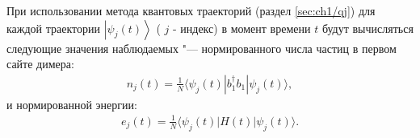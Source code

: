 При использовании метода квантовых траекторий (раздел \cref{sec:ch1/qj}) для каждой траектории \(\left| \psi_j(t) \right\rangle\) ( \(j\) - индекс) в момент времени \(t\) будут вычисляться следующие значения наблюдаемых "--- нормированного числа частиц в первом сайте димера:
\begin{equation}
	\label{eq:dimer_num_bosons}
	\begin{gathered}
		n_j(t) =  \frac{1}{N}\langle \psi_j(t)| b^\dagger_1 b_1 | \psi_j(t) \rangle,
	\end{gathered}
\end{equation}
и нормированной энергии:
\begin{equation}
	\label{eq:dimer_energy}
	\begin{gathered}
		e_j(t) = \frac{1}{N} \langle \psi_j(t)| H(t) | \psi_j(t) \rangle.
	\end{gathered}
\end{equation}

